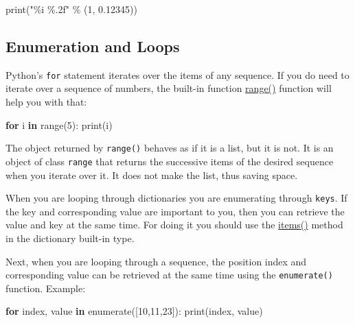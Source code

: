 \documentclass[
]{article}
\newenvironment{Shaded}{}{}
\newcommand{\BuiltInTok}[1]{#1}
\newcommand{\ControlFlowTok}[1]{\textcolor[rgb]{0.00,0.44,0.13}{\textbf{#1}}}
\newcommand{\DecValTok}[1]{\textcolor[rgb]{0.25,0.63,0.44}{#1}}
\newcommand{\FloatTok}[1]{\textcolor[rgb]{0.25,0.63,0.44}{#1}}
\newcommand{\KeywordTok}[1]{\textcolor[rgb]{0.00,0.44,0.13}{\textbf{#1}}}
\newcommand{\NormalTok}[1]{#1}
\newcommand{\OperatorTok}[1]{\textcolor[rgb]{0.40,0.40,0.40}{#1}}
\newcommand{\SpecialCharTok}[1]{\textcolor[rgb]{0.25,0.44,0.63}{#1}}
\newcommand{\StringTok}[1]{\textcolor[rgb]{0.25,0.44,0.63}{#1}}
\begin{document}
\begin{Shaded}
\begin{Highlighting}[]
\BuiltInTok{print}\NormalTok{(}\StringTok{"}\SpecialCharTok{\%i}\StringTok{ }\SpecialCharTok{\%.2f}\StringTok{"} \OperatorTok{\%}\NormalTok{ (}\DecValTok{1}\NormalTok{, }\FloatTok{0.12345}\NormalTok{))}
\end{Highlighting}
\end{Shaded}

\hypertarget{enumeration-and-loops}{%
\subsection{Enumeration and Loops}\label{enumeration-and-loops}}

Python's \texttt{for} statement iterates over the items of any sequence.
If you do need to iterate over a sequence of numbers, the built-in
function
\href{https://docs.python.org/3/library/stdtypes.html?highlight=range\#range}{range()}
function will help you with that:

\begin{Shaded}
\begin{Highlighting}[]
\ControlFlowTok{for}\NormalTok{ i }\KeywordTok{in} \BuiltInTok{range}\NormalTok{(}\DecValTok{5}\NormalTok{):}
    \BuiltInTok{print}\NormalTok{(i)}
\end{Highlighting}
\end{Shaded}

The object returned by \texttt{range()} behaves as if it is a list, but
it is not. It is an object of class \texttt{range} that returns the
successive items of the desired sequence when you iterate over it. It
does not make the list, thus saving space.

When you are looping through dictionaries you are enumerating through
\texttt{keys}. If the key and corresponding value are important to you,
then you can retrieve the value and key at the same time. For doing it
you should use the
\href{https://docs.python.org/3/library/stdtypes.html?highlight=items\#dict.items}{items()}
method in the dictionary built-in type.

Next, when you are looping through a sequence, the position index and
corresponding value can be retrieved at the same time using the
\texttt{enumerate()} function. Example:

\begin{Shaded}
\begin{Highlighting}[]
\ControlFlowTok{for}\NormalTok{  index, value }\KeywordTok{in} \BuiltInTok{enumerate}\NormalTok{([}\DecValTok{10}\NormalTok{,}\DecValTok{11}\NormalTok{,}\DecValTok{23}\NormalTok{]):}
  \BuiltInTok{print}\NormalTok{(index, value)}
\end{Highlighting}
\end{Shaded}
\end{document}
